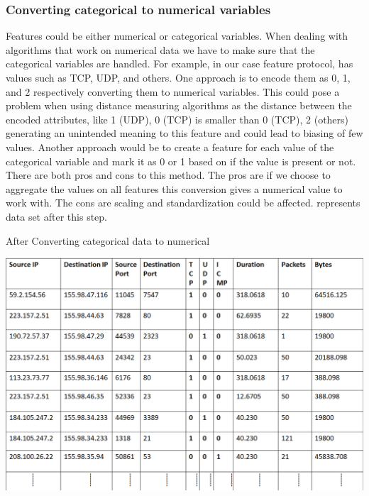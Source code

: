 \subsubsection{Converting categorical to numerical variables} 

Features could be either numerical or categorical variables. When dealing with algorithms that work on numerical data we have to make sure that the categorical variables are handled.
For example, in our case feature protocol, has values such as TCP, UDP, and others. One approach is to encode them as 0, 1, and 2 respectively converting them to numerical variables. This could pose a problem when using distance measuring algorithms as the distance between the encoded attributes, like 1 (UDP), 0 (TCP) is smaller than 0 (TCP), 2 (others) generating an unintended meaning to this feature and could lead to biasing of few values. Another approach would be to create a feature for each value of the categorical variable and mark it as 0 or 1 based on if the value is present or not. There are both pros and cons to this method. The pros are if we choose to aggregate the values on all features this conversion gives a numerical value to work with. The cons are scaling and standardization could be affected.  represents data set after this step.

\begin{table}[t]
	\caption{After Converting categorical data to numerical}%
	\centerline{\includegraphics[scale = 0.6]{categorical.png}}
\end{table}


